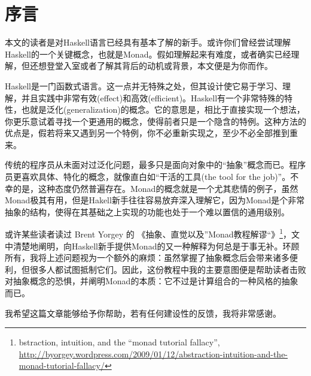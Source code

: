\section{序言}

本文的读者是对Haskell语言已经具有基本了解的新手。或许你们曾经尝试理解Haskell的一个关键概念，也就是Monad。假如理解起来有难度，或者确实已经理解，但还想登堂入室或者了解其背后的动机或背景，本文便是为你而作。

Haskell是一门函数式语言。这一点并无特殊之处，但其设计使它易于学习、理解，并且实践中非常有效(effect)和高效(efficient)。Haskell有一个非常特殊的特性，也就是泛化(generalization)的概念。它的意思是，相比于直接实现一个想法，你更乐意试着寻找一个更通用的概念，使得前者只是一个隐含的特例。这种方法的优点是，假若将来又遇到另一个特例，你不必重新实现之，至少不必全部推到重来。

传统的程序员从未面对过泛化问题，最多只是面向对象中的“抽象”概念而已。程序员更喜欢具体、特化的概念，就像直白如“干活的工具(the tool for the job)”。不幸的是，这种态度仍然普遍存在。Monad的概念就是一个尤其悲情的例子，虽然Monad极其有用，但是Hakell新手往往容易放弃深入理解它，因为Monad是个非常抽象的结构，使得在其基础之上实现的功能也处于一个难以置信的通用级别。

或许某些读者读过 Brent Yorgey 的 《抽象、直觉以及”Monad教程解谬“》\footnote{bstraction, intuition, and the ``monad tutorial fallacy'', \url{http://byorgey.wordpress.com/2009/01/12/abstraction-intuition-and-the-monad-tutorial-fallacy/}}，文中清楚地阐明，向Haskell新手提供Monad的又一种解释为何总是于事无补。环顾所有，我将上述问题视为一个额外的麻烦：虽然掌握了抽象概念后会带来诸多便利，但很多人都试图抵制它们。因此，这份教程中我的主要意图便是帮助读者击败对抽象概念的恐惧，并阐明Monad的本质：它不过是计算组合的一种风格的抽象而已。

我希望这篇文章能够给予你帮助，若有任何建设性的反馈，我将非常感谢。